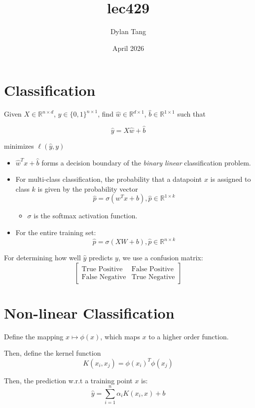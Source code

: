 \documentclass{article}
\title{lec429}
\author{Dylan Tang}
\date{April 2026}
\begin{document}
\maketitle

\section{Classification}

Given $X \in \mathbb{R}^{n \times d}$, $y \in \{0, 1\}^{n \times 1}$, find $\hat{w} \in \mathbb{R}^{d \times 1}$, $\hat{b} \in \mathbb{R}^{1 \times 1}$ such that

\[
    \hat{y} = X\hat{w} + \hat{b}
\]

minimizes $\ell(\hat{y}, y)$
\begin{itemize}
    \item $\hat{w}^Tx+\hat{b}$ forms a decision boundary of the \textit{binary linear} classification problem.
    \item For multi-class classification, the probability that a datapoint $x$ is assigned to class $k$ is given by the probability vector
    \[
            \hat{p} = \sigma(w^Tx+b), \hat{p} \in \mathbb{R}^{1 \times k}
    \]
    \begin{itemize}
        \item $\sigma$ is the softmax activation function.
    \end{itemize}
    \item For the entire training set:
    \[
        \hat{p} = \sigma(XW+b), \hat{p} \in \mathbb{R}^{n \times k}
    \]
\end{itemize}

For determining how well $\hat{y}$ predicts $y$, we use a confusion matrix:
\[
        \begin{bmatrix}
           \text{True Positive} & \text{False Positive} \\
           \text{False Negative} & \text{True Negative}
        \end{bmatrix}
\]

\section{Non-linear Classification}

Define the mapping $x \mapsto \phi(x)$, which maps $x$ to a higher order function.

Then, define the kernel function 
    \[
        K(x_i, x_j) = \phi(x_i)^T\phi(x_j)
    \]

Then, the prediction w.r.t a training point $x$ is:
    \[
        \hat{y} = \sum_{i = 1}^n \alpha_iK(x_i, x) + b
    \]
\end{document}
